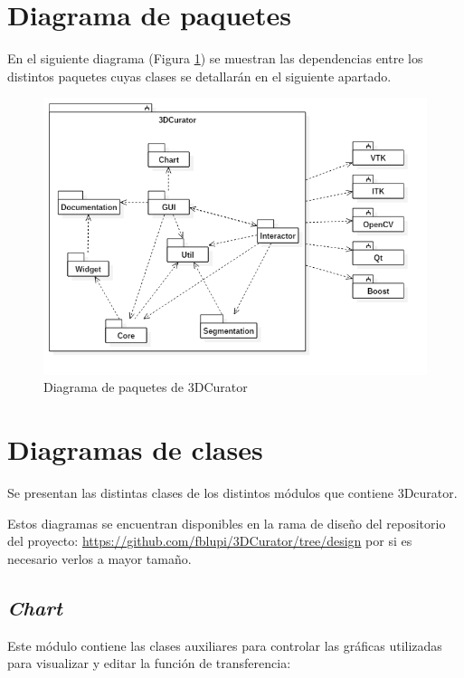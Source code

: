 \section{Diagrama de paquetes}

En el siguiente diagrama (Figura \ref{fig:diseno/package}) se muestran las dependencias entre los distintos paquetes cuyas clases se detallarán en el siguiente apartado.

\begin{figure}[H]
	\centering
	\includegraphics[width=12cm]{imagenes/diseno/package}
	\caption{Diagrama de paquetes de 3DCurator}
	\label{fig:diseno/package}
\end{figure}

\section{Diagramas de clases}

Se presentan las distintas clases de los distintos módulos que contiene 3Dcurator.

Estos diagramas se encuentran disponibles en la rama de diseño del repositorio del proyecto: \url{https://github.com/fblupi/3DCurator/tree/design} por si es necesario verlos a mayor tamaño.

\subsection{\textit{Chart}}

Este módulo contiene las clases auxiliares para controlar las gráficas utilizadas para visualizar y editar la función de transferencia:

